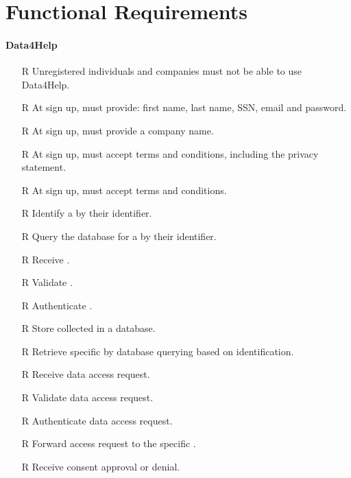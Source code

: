 \documentclass[../../rasd.tex]{subfiles}
\begin{document}
\section{Functional Requirements}

        \paragraph{Data4Help}
        \begin{itemize}
            \item[R\subs{1}]Unregistered individuals and companies must not be able to use Data4Help.
            \item[R\subs{2}]At sign up,  must provide: first name, last name, SSN, email and password.
            \item[R\subs{3}]At sign up,  must provide a company name.
            \item[R\subs{4}]At sign up,  must accept terms and conditions, including the privacy statement.
            \item[R\subs{5}]At sign up,  must accept terms and conditions.
            \item[R\subs{6}]Identify a  by their identifier.
            \item[R\subs{7}]Query the database for a  by their identifier.
            \item[R\subs{8}]Receive .
            \item[R\subs{9}]Validate .
            \item[R\subs{10}]Authenticate .
            \item[R\subs{11}]Store collected  in a database.
            \item[R\subs{12}]Retrieve specific  by database querying based on  identification.
            \item[R\subs{13}]Receive  data access request.
            \item[R\subs{14}]Validate  data access request.
            \item[R\subs{15}]Authenticate  data access request.
            \item[R\subs{16}]Forward  access request to the specific .
            \item[R\subs{17}]Receive  consent approval or denial.

\end{itemize}
\end{document}
